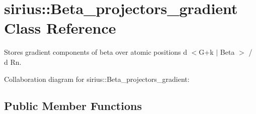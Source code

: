 \hypertarget{classsirius_1_1_beta__projectors__gradient}{}\section{sirius\+:\+:Beta\+\_\+projectors\+\_\+gradient Class Reference}
\label{classsirius_1_1_beta__projectors__gradient}


Stores gradient components of beta over atomic positions d $<$G+k $\vert$ Beta $>$ / d Rn.  




Collaboration diagram for sirius\+:\+:Beta\+\_\+projectors\+\_\+gradient\+:
\subsection*{Public Member Functions}
